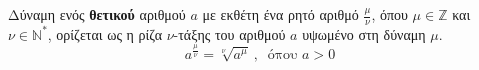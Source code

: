 Δύναμη ενός \textbf{θετικού} αριθμού $ a $ με εκθέτη ένα ρητό αριθμό $ \frac{\mu}{\nu} $, όπου $ \mu\in\mathbb{Z} $ και $ \nu\in\mathbb{N}^* $, ορίζεται ως η ρίζα $ \nu $-τάξης του αριθμού $ a $ υψωμένο στη δύναμη $ \mu $.
\[ a^{\frac{\mu}{\nu}}=\!\sqrt[\nu]{a^\mu}\ ,\ \textrm{ όπου } a>0 \]
